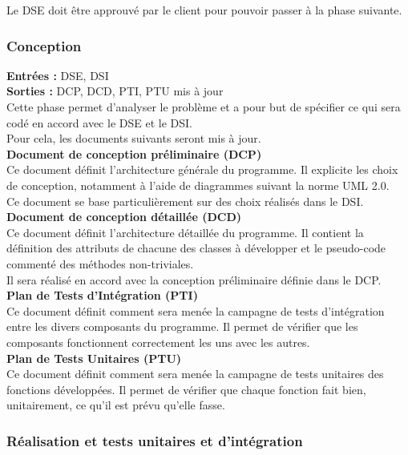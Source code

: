 Le DSE doit être approuvé par le client pour pouvoir passer à la phase suivante. \\


\subsubsection{Conception}

\textbf{Entrées :} DSE, DSI \\
\textbf{Sorties :} DCP, DCD, PTI, PTU mis à jour\\
Cette phase permet d’analyser le problème et a pour but de spécifier ce qui sera codé en accord avec le DSE et le DSI. \\
Pour cela, les documents suivants seront mis à jour. \\

\textbf{Document de conception préliminaire (DCP)} \\
Ce document définit l’architecture générale du programme. Il explicite les choix de conception, notamment à l’aide de diagrammes suivant la norme UML 2.0.\\ 
Ce document se base particulièrement sur des choix réalisés dans le DSI. \\

\textbf{Document de conception détaillée (DCD)} \\
Ce document définit l’architecture détaillée du programme. Il contient la définition des attributs de chacune des classes à développer et le pseudo-code commenté des méthodes non-triviales.\\
Il sera réalisé en accord avec la conception préliminaire définie dans le DCP.\\
\textbf{Plan de Tests d’Intégration (PTI)} \\
Ce document définit comment sera menée la campagne de tests d’intégration entre les divers composants du programme. Il permet de vérifier que les composants fonctionnent correctement les uns avec les autres.\\

\textbf{Plan de Tests Unitaires (PTU)} \\

Ce document définit comment sera menée la campagne de tests unitaires des fonctions développées. Il permet de vérifier que chaque fonction fait bien, unitairement, ce qu’il est prévu qu’elle fasse. \\


\subsubsection{Réalisation et tests unitaires et d’intégration}

